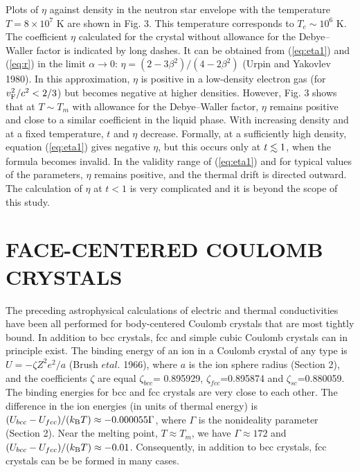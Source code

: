 %
Plots of $\eta$ against density in the neutron star envelope
with the temperature $T = 8 \times 10^7$ K are shown in Fig. 3. This
temperature corresponds to $T_e \sim 10^6$ K. The coefficient $\eta$
calculated for the crystal without allowance for the Debye--Waller
factor is indicated by long dashes. It can be obtained from (\ref{eq:eta1}) 
and (\ref{eq:r}) in the limit $\alpha \rightarrow 0$: $\eta = (2-3 \beta^2)/
(4-2 \beta^2)$ (Urpin and Yakovlev 1980). In this approximation,
$\eta$ is positive in a low-density electron gas 
(for $v_{\rm F}^2/c^2 <2/3 $) but becomes negative at
higher densities. However, Fig. 3 shows that at $T \sim T_m$ with
allowance for the Debye--Waller factor, $\eta$ remains positive and
close to a similar coefficient in the liquid phase. With increasing
density and at a fixed temperature, $t$ and $\eta$ decrease.
Formally, at a sufficiently high density, equation
(\ref{eq:eta1}) gives negative $\eta$, but this occurs only 
at $t \la 1$, when the formula becomes invalid.
In the validity range of (\ref{eq:eta1}) and for
typical values of the parameters, $\eta$ remains positive, and the
thermal drift is directed outward. The calculation of $\eta$ at $t < 1$
is very complicated and it is beyond the scope of this study.

\section{FACE-CENTERED COULOMB CRYSTALS}
%
The preceding astrophysical calculations of electric and thermal
conductivities have been all performed for body-centered Coulomb
crystals that are most tightly bound. In addition to bcc crystals,
fcc and simple cubic Coulomb crystals can in principle exist. The
binding energy of an ion in a Coulomb crystal of any type is $U=-\zeta 
Z^2e^2/a$ (Brush $et al.$ 1966), where $a$ is the ion sphere radius
(Section 2), and the coefficients $\zeta$ are equal 
$\zeta_{bcc}$= 0.895929, $\zeta_{fcc}$=0.895874 and
$\zeta_{sc}$=0.880059. The binding energies
for bcc and fcc crystals are very close to each other. The
difference in the ion energies (in units of thermal energy) is
$(U_{bcc}-U_{fcc})/(\mbox{$k_{\rm B}$} T) \approx - 0.000055 \Gamma$,
where $\Gamma$ is the nonideality parameter (Section 2). Near
the melting point, $T \approx T_m$, we have $\Gamma \approx 172$
and $(U_{bcc}-U_{fcc})/(\mbox{$k_{\rm B}$} T) \approx - 0.01$.
Consequently, in addition to bcc crystals, fcc crystals can be
be formed in many cases.

